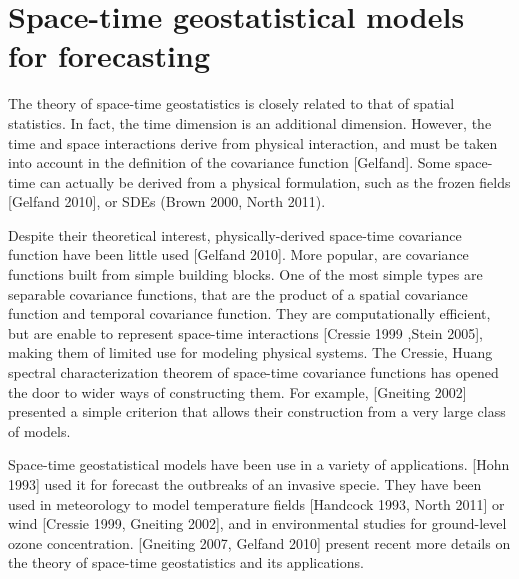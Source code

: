 \section{Space-time geostatistical models for forecasting}

The theory of space-time geostatistics is closely related to that of spatial statistics. In fact, the time dimension is an additional dimension. However, the time and space interactions derive from physical interaction, and must be taken into account in the definition of the covariance function [Gelfand]. Some space-time can actually be derived from a physical formulation, such as the frozen fields [Gelfand 2010], or SDEs (Brown 2000, North 2011). 

Despite their theoretical interest, physically-derived space-time covariance function have been little used [Gelfand 2010]. More popular, are covariance functions built from simple building blocks. One of the most simple types are separable covariance functions, that are the product of a spatial covariance function and temporal covariance function. They are computationally efficient, but are enable to represent space-time interactions [Cressie 1999 ,Stein 2005], making them of limited use for modeling physical systems. The Cressie, Huang spectral characterization theorem of space-time covariance functions has opened the door to wider ways of constructing them. For example, [Gneiting 2002] presented a simple criterion that allows their construction from a very large class of models. 

Space-time geostatistical models have been use in a variety of applications. [Hohn 1993] used it for forecast the outbreaks of an invasive specie. They have been used in meteorology to model temperature fields [Handcock 1993, North 2011] or wind [Cressie 1999, Gneiting 2002], and in environmental studies for ground-level ozone concentration. [Gneiting 2007, Gelfand 2010] present recent more details on the theory of space-time geostatistics and its applications.  

